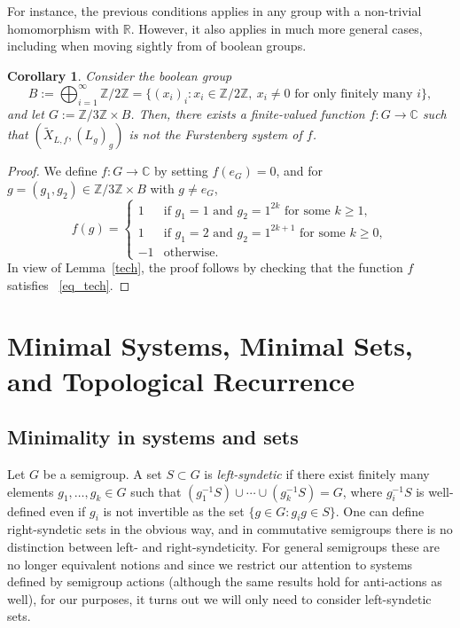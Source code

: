 \documentclass{amsart}
\numberwithin{equation}{section}
\newtheorem{corollary}[lemma]{Corollary}
\theoremstyle{definition}
\theoremstyle{plain}
\newcommand{\Z}{{\mathbb Z}}
\begin{document}
For instance, the previous conditions applies in any group with a non-trivial homomorphism with $\mathbb{R}$. However, it also applies in much more general cases, including when moving sightly from of boolean groups.
\begin{corollary}
    Consider the boolean group $$B := \bigoplus_{i=1}^\infty \mathbb{Z}/2\mathbb{Z}
= \{(x_i)_i : x_i \in \mathbb{Z}/2\mathbb{Z},\ x_i \neq 0 \text{ for only finitely many } i\},$$
and let $G:=\Z/3\Z \times  B$. Then, there exists a finite-valued function $f:G\to \mathbb{C}$ such that $(\widetilde{X}_{L,f},(L_g)_g)$ is not the Furstenberg system of $f$.
\end{corollary}

\begin{proof}
We define $f : G \to \mathbb{C}$ by setting $f(e_G) = 0$, and for 
$g = (g_1, g_2) \in \mathbb{Z}/3\mathbb{Z} \times B$ with $g \neq e_G$,
\[
f(g) =
\begin{cases}
1 & \text{if } g_1 = 1 \text{ and } g_2 = 1^{2k} \text{ for some } k \geq 1, \\
1 & \text{if } g_1 = 2 \text{ and } g_2 = 1^{2k+1} \text{ for some } k \geq 0, \\
-1 & \text{otherwise.}
\end{cases}
\]
In view of Lemma~\ref{tech}, the proof follows by checking that the function 
$f$ satisfies ~\eqref{eq_tech}. 

\end{proof}
    
   
        
\section{Minimal Systems, Minimal Sets, and Topological Recurrence}
\label{sec:5}
\subsection{Minimality in systems and sets}\label{sec:minimal}
Let $G$ be a semigroup. A set $S\subset G$ is \textit{left-syndetic} if 
there exist finitely many elements $g_1,\ldots,g_k\in G$ such that $(g_1^{-1}S) \cup \cdots \cup (g_k^{-1}S)=G$, where $g_i^{-1}S$ is well-defined even if $g_i$ is not invertible as the set $\{g\in G: g_ig \in S\}$. 
One can define right-syndetic sets in the obvious way, and in commutative
semigroups there is no distinction between left- and right-syndeticity. For general semigroups these are no longer equivalent notions and since we restrict our attention to systems defined by semigroup actions (although the same results hold for anti-actions as well), for our purposes, it turns out we will only need to consider left-syndetic sets. 
\end{document}

